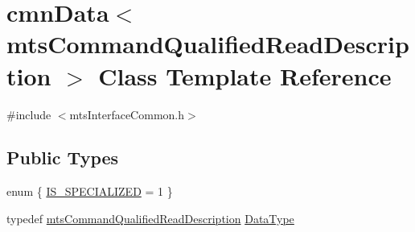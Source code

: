 \hypertarget{classcmn_data_3_01mts_command_qualified_read_description_01_4}{}\section{cmn\+Data$<$ mts\+Command\+Qualified\+Read\+Description $>$ Class Template Reference}
\label{classcmn_data_3_01mts_command_qualified_read_description_01_4}


{\ttfamily \#include $<$mts\+Interface\+Common.\+h$>$}

\subsection*{Public Types}
\begin{DoxyCompactItemize}
\item 
enum \{ \hyperlink{classcmn_data_3_01mts_command_qualified_read_description_01_4_a11f36fde8fbdd159da4585fc452d3572ad7df40cb2dad2bfe87d4f22209cde01f}{I\+S\+\_\+\+S\+P\+E\+C\+I\+A\+L\+I\+Z\+E\+D} = 1
 \}
\item 
typedef \hyperlink{classmts_command_qualified_read_description}{mts\+Command\+Qualified\+Read\+Description} \hyperlink{classcmn_data_3_01mts_command_qualified_read_description_01_4_a806c74676540892a3a54aed2f6e4d040}{Data\+Type}
\end{DoxyCompactItemize}
